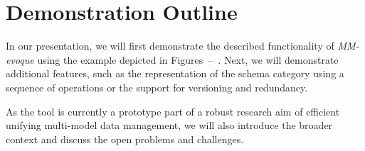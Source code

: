 









    

\section{Demonstration Outline}
In our presentation, we will first demonstrate the described functionality of \textit{MM-evoque} using the example depicted in Figures~--~. Next, we will demonstrate additional features, such as the representation of the schema category using a sequence of operations or the support for versioning and redundancy. 

As the tool is currently a prototype part of a robust research aim of efficient unifying multi-model data management, we will also introduce the broader context and discuss the open problems and challenges. 

